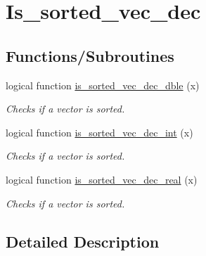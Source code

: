 \hypertarget{group__is__sorted__vec__dec}{\section{Is\-\_\-sorted\-\_\-vec\-\_\-dec}
\label{group__is__sorted__vec__dec}
}
\subsection*{Functions/\-Subroutines}
\begin{DoxyCompactItemize}
\item 
logical function \hyperlink{group__is__sorted__vec__dec_gafa8f0380a781510c916f7d2315dda59c_gafa8f0380a781510c916f7d2315dda59c}{is\-\_\-sorted\-\_\-vec\-\_\-dec\-\_\-dble} (x)
\begin{DoxyCompactList}\small\item\em Checks if a vector is sorted. \end{DoxyCompactList}\item 
logical function \hyperlink{group__is__sorted__vec__dec_ga48c16c00ddcf8f16c23c2a4e4049f459_ga48c16c00ddcf8f16c23c2a4e4049f459}{is\-\_\-sorted\-\_\-vec\-\_\-dec\-\_\-int} (x)
\begin{DoxyCompactList}\small\item\em Checks if a vector is sorted. \end{DoxyCompactList}\item 
logical function \hyperlink{group__is__sorted__vec__dec_ga0ea359f8f42c8716f34091cde59c4e97_ga0ea359f8f42c8716f34091cde59c4e97}{is\-\_\-sorted\-\_\-vec\-\_\-dec\-\_\-real} (x)
\begin{DoxyCompactList}\small\item\em Checks if a vector is sorted. \end{DoxyCompactList}\end{DoxyCompactItemize}


\subsection{Detailed Description}


